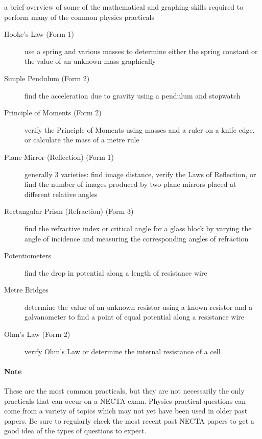 \begin{description} \itemsep1pt \parskip0pt 
\item[Mathematics]{a brief overview of some of the mathematical and graphing skills required to perform many of the common physics practicals}
\item[Mechanics] \hfill 
\begin{description} 
\item[Hooke's Law (Form 1)]{use a spring and various masses to determine either the spring constant or the value of an unknown mass graphically}
\item[Simple Pendulum (Form 2)]{find the acceleration due to gravity using a pendulum and stopwatch}
\item[Principle of Moments (Form 2)]{verify the Principle of Moments using masses and a ruler on a knife edge, or calculate the mass of a metre rule}
\end{description}
\item[Light] \hfill 
\begin{description}
\item[Plane Mirror (Reflection) (Form 1)]{generally 3 varieties: find image distance, verify the Laws of Reflection, or find the number of images produced by two plane mirrors placed at different relative angles}
\item[Rectangular Prism (Refraction) (Form 3)]{find the refractive index or critical angle for a glass block by varying the angle of incidence and measuring the corresponding angles of refraction}
\end{description}
\item[Electricity] \hfill 
\begin{description} 
\item[Potentiometers]{find the drop in potential along a length of resistance wire}
\item[Metre Bridges]{determine the value of an unknown resistor using a known resistor and a galvanometer to find a point of equal potential along a resistance wire}
\item[Ohm's Law (Form 2)]{verify Ohm's Law or determine the internal resistance of a cell}
\end{description}
\end{description}

\paragraph{Note} These are the most common practicals, but they are not necessarily the only practicals that can occur on a NECTA exam. Physics practical questions can come from a variety of topics which may not yet have been used in older past papers. Be sure to regularly check the most recent past NECTA papers to get a good idea of the types of questions to expect. 

